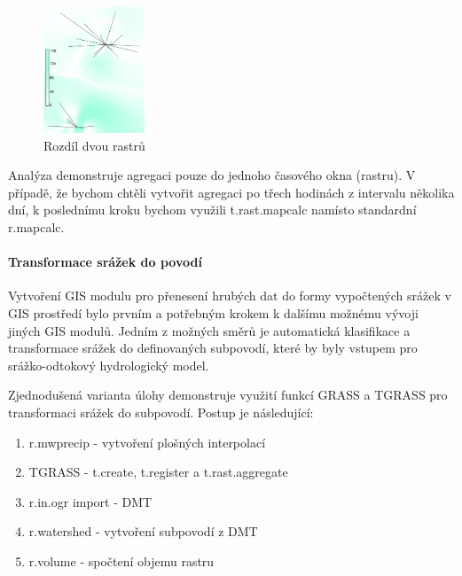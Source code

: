 \documentclass[a4paper,12pt,oneside]{report}
\begin{document}
\begin{figure}[h!]
    \centering
    \includegraphics[width=0.27\textwidth]{./img/intanalys/rozdil.png}
    \caption[GUI modul]{Rozdíl dvou rastrů  \centering  }
        \label{fig:baseline}
 \end{figure}
 
Analýza demonstruje agregaci pouze do jednoho časového okna (rastru). V případě, že bychom chtěli vytvořit  agregaci po třech hodinách z intervalu několika dní, k poslednímu kroku bychom využili t.rast.mapcalc namísto standardní r.mapcalc.

\paragraph*{Transformace srážek do povodí}
Vytvoření GIS modulu pro přenesení hrubých dat do formy vypočtených srážek v GIS prostředí bylo prvním a potřebným krokem k dalšímu možnému vývoji jiných GIS modulů. Jedním z možných směrů je automatická klasifikace a transformace srážek do definovaných subpovodí, které by byly vstupem pro srážko-odtokový hydrologický model.

Zjednodušená varianta úlohy demonstruje využití funkcí GRASS a TGRASS pro transformaci srážek do subpovodí. Postup je následující:

\begin{enumerate}
\item r.mwprecip - vytvoření plošných interpolací
\item TGRASS - t.create, t.register a t.rast.aggregate
\item r.in.ogr import - \acs{DMT}
\item r.watershed -  vytvoření subpovodí z DMT
\item r.volume - spočtení objemu rastru
\end{enumerate}
\end{document}
